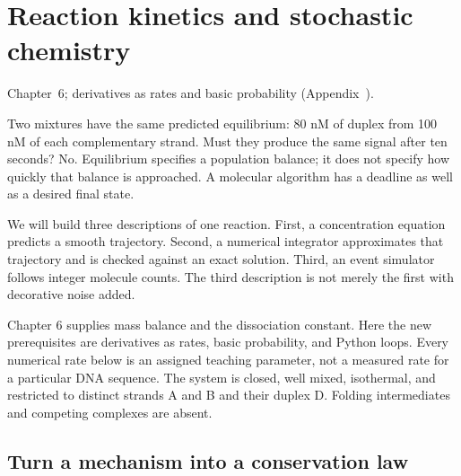 \chapter{Reaction kinetics and stochastic chemistry}
{Chapter~6; derivatives as rates and basic probability (Appendix~).}

Two mixtures have the same predicted equilibrium: 80 nM of duplex from
100 nM of each complementary strand. Must they produce the same signal
after ten seconds? No. Equilibrium specifies a population balance; it does
not specify how quickly that balance is approached. A molecular algorithm
has a deadline as well as a desired final state.

We will build three descriptions of one reaction. First, a concentration
equation predicts a smooth trajectory. Second, a numerical integrator
approximates that trajectory and is checked against an exact solution.
Third, an event simulator follows integer molecule counts. The third
description is not merely the first with decorative noise added.

Chapter 6 supplies mass balance and the dissociation constant. Here the
new prerequisites are derivatives as rates, basic probability, and Python
loops. Every numerical rate below is an assigned teaching parameter,
not a measured rate for a particular DNA sequence. The system is closed,
well mixed, isothermal, and restricted to distinct strands A and B and
their duplex D. Folding intermediates and competing complexes are absent.

\section{Turn a mechanism into a conservation law}

